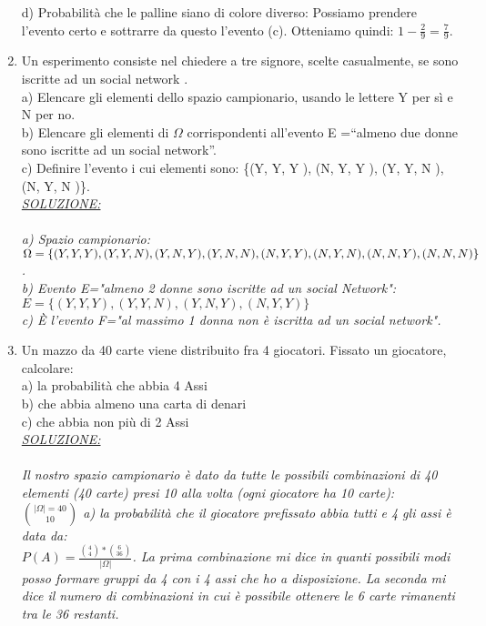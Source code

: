 \documentclass{article}
\begin{document}
\begin{enumerate}
{d) Probabilità che le palline siano di colore diverso: Possiamo prendere l'evento certo e sottrarre da questo l'evento (c). Otteniamo quindi: $1-\frac{2}{9} = \frac{7}{9}$. \\
}
\item Un esperimento consiste nel chiedere a tre signore, scelte casualmente, se sono iscritte
ad un social network .\\
a) Elencare gli elementi dello spazio campionario, usando le lettere Y per sì e N
per no.\\
b) Elencare gli elementi di $\Omega$ corrispondenti all’evento E =“almeno due donne sono
iscritte ad un social network”.\\
c) Definire l’evento i cui elementi sono:
\{(Y, Y, Y ), (N, Y, Y ), (Y, Y, N ), (N, Y, N )\}.\\
\emph{\underline{SOLUZIONE:}\\ \\
a) Spazio campionario: $\Omega=\{(Y,Y,Y),(Y,Y,N),(Y,N,Y),(Y,N,N),(N,Y,Y),\\(N,Y,N), (N,N,Y), (N,N,N)\}$.\\
b) Evento E="almeno 2 donne sono iscritte ad un social Network":\\
$E=\{(Y,Y,Y), (Y,Y,N),(Y,N,Y), (N,Y,Y) \}$ \\
c) È l'evento F="al massimo 1 donna non è iscritta ad un social network".\\
}
\item Un mazzo da 40 carte viene distribuito fra 4 giocatori. Fissato un giocatore, calcolare:\\
a) la probabilità che abbia 4 Assi\\ 
b) che abbia almeno una carta di denari\\
c) che abbia non più di 2 Assi\\
\emph{\underline{SOLUZIONE:}\\ \\
Il nostro spazio campionario è dato da tutte le possibili combinazioni di 40 elementi (40 carte) presi 10 alla volta (ogni giocatore ha 10 carte):\\
$|\Omega| = {40}\choose{10}$
a) la probabilità che il giocatore prefissato abbia tutti e 4 gli assi è data da:\\
$P(A) = \frac{{{4}\choose{4}} * {{6}\choose{36}}}{|\Omega|}$.  La prima combinazione mi dice in quanti possibili modi posso formare gruppi da 4 con i 4 assi che ho a disposizione. La seconda mi dice il numero di combinazioni in cui è possibile ottenere le 6 carte rimanenti tra le 36 restanti.\\
}
\end{enumerate}
\end{document}
